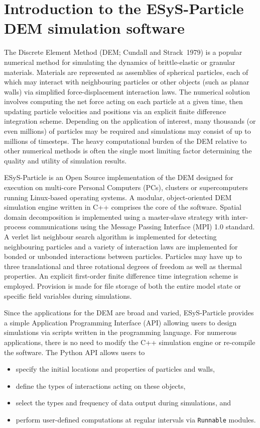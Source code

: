 \chapter[Introduction]{Introduction to the ESyS-Particle DEM simulation software}


The Discrete Element Method (DEM; Cundall and Strack~1979) is a popular numerical method for simulating the dynamics of brittle-elastic or granular materials. Materials are represented as assemblies of spherical particles, each of which may interact with neighbouring particles or other objects (such as planar walls) via simplified force-displacement interaction laws. The numerical solution involves computing the net force acting on each particle at a given time, then updating particle velocities and positions via an explicit finite difference integration scheme. Depending on the application of interest, many thousands (or even millions) of particles may be required and simulations may consist of up to millions of timesteps. The heavy computational burden of the DEM relative to other numerical methods is often the single most limiting factor determining the quality and utility of simulation results. 

ESyS-Particle is an Open Source implementation of the DEM designed for execution on multi-core Personal Computers (PCs), clusters or supercomputers running Linux-based operating systems. A modular, object-oriented DEM simulation engine written in C++ comprises the core of the software. Spatial domain decomposition is implemented using a master-slave strategy with inter-process communications using the Message Passing Interface (MPI) 1.0 standard. A verlet list neighbour search algorithm is implemented for detecting neighbouring particles and a variety of interaction laws are implemented for bonded or unbonded interactions between particles. Particles may have up to three translational and three rotational degrees of freedom as well as thermal properties. An explicit first-order finite difference time integration scheme is employed. Provision is made for file storage of both the entire model state or specific field variables during simulations.

Since the applications for the DEM are broad and varied, ESyS-Particle provides a simple Application Programming Interface (API) allowing users to design simulations via scripts written in the  programming language. For numerous applications, there is no need to modify the C++ simulation engine or re-compile the software. The Python API allows users to
\begin{itemize}
\item specify the initial locations and properties of particles and walls, 
\item define the types of interactions acting on these objects,
\item select the types and frequency of data output during simulations, and
\item perform user-defined computations at regular intervals via \texttt{Runnable} modules.
\end{itemize}

